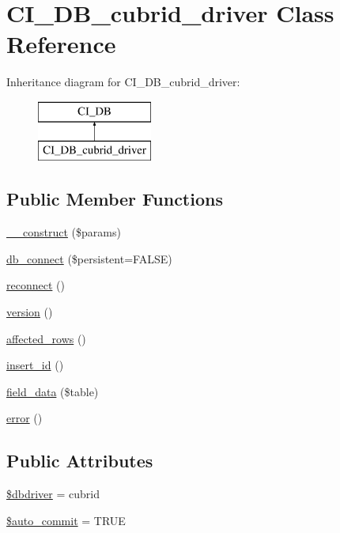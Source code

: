 \hypertarget{class_c_i___d_b__cubrid__driver}{}\section{C\+I\+\_\+\+D\+B\+\_\+cubrid\+\_\+driver Class Reference}
\label{class_c_i___d_b__cubrid__driver}
Inheritance diagram for C\+I\+\_\+\+D\+B\+\_\+cubrid\+\_\+driver\+:\begin{figure}[H]
\begin{center}
\leavevmode
\includegraphics[height=2.000000cm]{class_c_i___d_b__cubrid__driver}
\end{center}
\end{figure}
\subsection*{Public Member Functions}
\begin{DoxyCompactItemize}
\item 
\mbox{\hyperlink{class_c_i___d_b__cubrid__driver_a9162320adff1a1a4afd7f2372f753a3e}{\+\_\+\+\_\+construct}} (\$params)
\item 
\mbox{\hyperlink{class_c_i___d_b__cubrid__driver_a52bf595e79e96cc0a7c907a9b45aeb4d}{db\+\_\+connect}} (\$persistent=F\+A\+L\+SE)
\item 
\mbox{\hyperlink{class_c_i___d_b__cubrid__driver_a57c19c642ab3023e28d10c50f86ff0a8}{reconnect}} ()
\item 
\mbox{\hyperlink{class_c_i___d_b__cubrid__driver_a6080dae0886626b9a4cedb29240708b1}{version}} ()
\item 
\mbox{\hyperlink{class_c_i___d_b__cubrid__driver_a77248aaad33eb132c04cc4aa3f4bc8cb}{affected\+\_\+rows}} ()
\item 
\mbox{\hyperlink{class_c_i___d_b__cubrid__driver_a933f2cde8dc7f87875e257d0a4902e99}{insert\+\_\+id}} ()
\item 
\mbox{\hyperlink{class_c_i___d_b__cubrid__driver_a90355121e1ed009e0efdbd544ab56efa}{field\+\_\+data}} (\$table)
\item 
\mbox{\hyperlink{class_c_i___d_b__cubrid__driver_a43b8d30b879d4f09ceb059b02af2bc02}{error}} ()
\end{DoxyCompactItemize}
\subsection*{Public Attributes}
\begin{DoxyCompactItemize}
\item 
\mbox{\hyperlink{class_c_i___d_b__cubrid__driver_a0cde2a16322a023d040aa7f725877597}{\$dbdriver}} = \textquotesingle{}cubrid\textquotesingle{}
\item 
\mbox{\hyperlink{class_c_i___d_b__cubrid__driver_a2620b91fdfd73aa770c443ad172f1914}{\$auto\+\_\+commit}} = T\+R\+UE
\end{DoxyCompactItemize}
